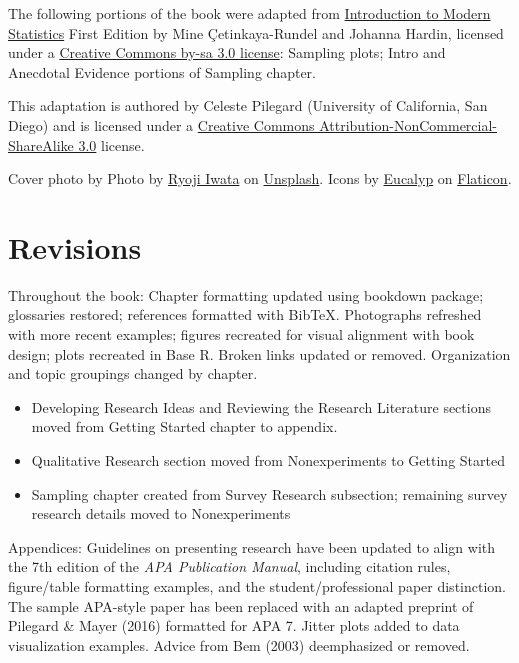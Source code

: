 \documentclass[
]{krantz}
\providecommand{\tightlist}{%
  \setlength{\itemsep}{0pt}\setlength{\parskip}{0pt}}
\begin{document}
The following portions of the book were adapted from \href{http://openintro.org/book/ims}{Introduction to Modern Statistics} First Edition by Mine Çetinkaya-Rundel and Johanna Hardin, licensed under a \href{https://creativecommons.org/licenses/by-sa/3.0/}{Creative Commons by-sa 3.0 license}: Sampling plots; Intro and Anecdotal Evidence portions of Sampling chapter.

This adaptation is authored by Celeste Pilegard (University of California, San Diego) and is licensed under a \href{https://creativecommons.org/licenses/by-nc-sa/3.0/}{Creative Commons Attribution-NonCommercial-ShareAlike 3.0} license.

Cover photo by Photo by \href{https://unsplash.com/@ryoji__iwata?utm_source=unsplash\&utm_medium=referral\&utm_content=creditCopyText}{Ryoji Iwata} on \href{https://unsplash.com/@ryoji__iwata?utm_source=unsplash\&utm_medium=referral\&utm_content=creditCopyText}{Unsplash}. Icons by \href{https://creativemarket.com/eucalyp}{Eucalyp} on \href{https://www.flaticon.com/}{Flaticon}.

\hypertarget{revisions}{%
\section*{Revisions}\label{revisions}}


Throughout the book: Chapter formatting updated using bookdown package; glossaries restored; references formatted with BibTeX. Photographs refreshed with more recent examples; figures recreated for visual alignment with book design; plots recreated in Base R. Broken links updated or removed. Organization and topic groupings changed by chapter.

\begin{itemize}
\tightlist
\item
  Developing Research Ideas and Reviewing the Research Literature sections moved from Getting Started chapter to appendix.
\item
  Qualitative Research section moved from Nonexperiments to Getting Started
\item
  Sampling chapter created from Survey Research subsection; remaining survey research details moved to Nonexperiments
\end{itemize}

Appendices: Guidelines on presenting research have been updated to align with the 7th edition of the \emph{APA Publication Manual}, including citation rules, figure/table formatting examples, and the student/professional paper distinction. The sample APA-style paper has been replaced with an adapted preprint of Pilegard \& Mayer (2016) formatted for APA 7. Jitter plots added to data visualization examples. Advice from Bem (2003) deemphasized or removed.
\end{document}
